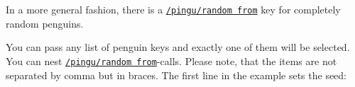 \documentclass[parskip=half,english,numbers=noenddot,footnotes=nomultiple,oneside]{scrartcl}
\makeatletter
\let\say\enquote
\def\DTLlistformatitem#1{\textit{#1\expandafter\ParseDTLListElement :#1\@nil}}
\newcommand*\typesetselection[1][]{\begingroup\ifx!#1!\else\def\DTLlistformatitem##1{#1}\fi\dotypesetselection}
\def\dotypesetselection#1{\label{expl-list:#1}\def\CurrentList{#1}\expandafter\DTLformatlist\expandafter{\csname @pingu@#1@\endcsname}\endgroup}
\def\lpingu#1{\lstinline[style=lstpingu,language=pingulang]'#1'}
\newcommand*\keyref[2][/pingu/]{\hyperref[pk:#1#2]{\lpingu{#1#2}}}
\makeatother
\begin{document}
In a more general fashion, there is a \keyref{random from} key for completely random penguins.

	You can pass any list of penguin keys and exactly one of them will be selected. You can nest \keyref{random from}-calls. Please note, that the items are not separated by comma but in braces. The first line in the example sets the seed:%
\begin{tcblisting}{}
\pgfmathsetseed{\number\pdfrandomseed}
\begin{tikzpicture}
	\pingu[random from={{eye patch left}{eye patch right}{halo,halo raise=4mm}},random from={{right eye color=pingu@blue}{random from={{bow tie}{gold medal}}}},random from={{eyes=!random}{wings=!random}},body type=legacy]
\end{tikzpicture}
\end{tcblisting}
\endkeyexplain




\end{document}
